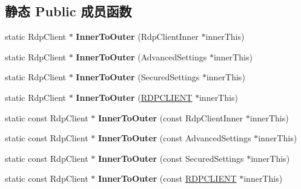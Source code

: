 \subsection*{静态 Public 成员函数}
\begin{DoxyCompactItemize}
\item 
\mbox{\label{class_s_e_a_l_e_d___a3417638b01ce13adaf400181c587a32b}} 
static Rdp\+Client $\ast$ {\bfseries Inner\+To\+Outer} (Rdp\+Client\+Inner $\ast$inner\+This)
\item 
\mbox{\label{class_s_e_a_l_e_d___abc876d7a03b7e1521cb8130777b3f2a4}} 
static Rdp\+Client $\ast$ {\bfseries Inner\+To\+Outer} (Advanced\+Settings $\ast$inner\+This)
\item 
\mbox{\label{class_s_e_a_l_e_d___a8627a82cc5caa903f6ba367b928d2ff7}} 
static Rdp\+Client $\ast$ {\bfseries Inner\+To\+Outer} (Secured\+Settings $\ast$inner\+This)
\item 
\mbox{\label{class_s_e_a_l_e_d___a5ce4028228071c3f58f1738f29e2331f}} 
static Rdp\+Client $\ast$ {\bfseries Inner\+To\+Outer} (\hyperlink{structrdpclient}{R\+D\+P\+C\+L\+I\+E\+NT} $\ast$inner\+This)
\item 
\mbox{\label{class_s_e_a_l_e_d___ad16bb87432765add3ef62842fdaff90b}} 
static const Rdp\+Client $\ast$ {\bfseries Inner\+To\+Outer} (const Rdp\+Client\+Inner $\ast$inner\+This)
\item 
\mbox{\label{class_s_e_a_l_e_d___a207986416d81c55763199c7c39804506}} 
static const Rdp\+Client $\ast$ {\bfseries Inner\+To\+Outer} (const Advanced\+Settings $\ast$inner\+This)
\item 
\mbox{\label{class_s_e_a_l_e_d___a987be31c0604dad2f6c31b3cd97fc682}} 
static const Rdp\+Client $\ast$ {\bfseries Inner\+To\+Outer} (const Secured\+Settings $\ast$inner\+This)
\item 
\mbox{\label{class_s_e_a_l_e_d___ab0e6363ce3e49089d474502e9f45c8f3}} 
static const Rdp\+Client $\ast$ {\bfseries Inner\+To\+Outer} (const \hyperlink{structrdpclient}{R\+D\+P\+C\+L\+I\+E\+NT} $\ast$inner\+This)

\end{DoxyCompactItemize}
